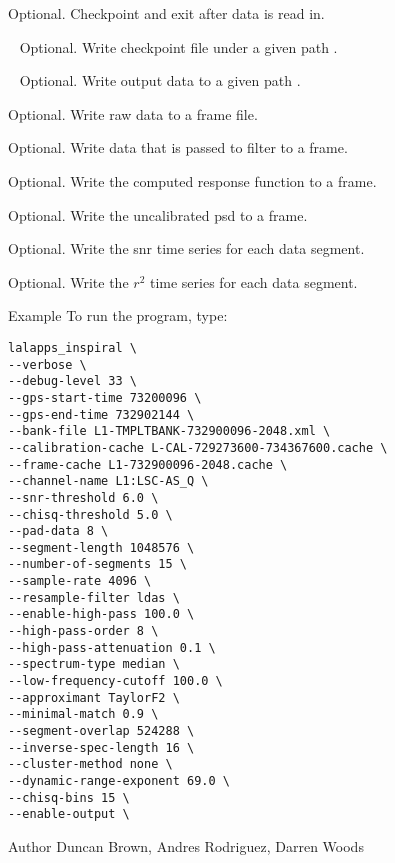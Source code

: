 \begin{entry}
\begin{entry}
\item[\option{--data-checkpoint}] Optional. Checkpoint and exit after data 
is read in.

\item[\option{--checkpoint-path}~\parm{PATH}] Optional. Write checkpoint 
file under a given path .

\item[\option{--output-path}~\parm{PATH}] Optional. Write output data to 
a given path .

\item[\option{--write-raw-data}] Optional. Write raw data to a frame file.

\item[\option{--write-filter-data}] Optional. Write data that is passed to 
filter to a frame.

\item[\option{--write-response}] Optional. Write the computed response 
function to a frame.

\item[\option{--write-spectrum}] Optional. Write the uncalibrated psd to a 
frame.

\item[\option{--write-snrsq}] Optional. Write the snr time series for each 
data segment.

\item[\option{--write-chisq}] Optional. Write the $r^2$ time series for each 
data segment.


\end{entry}

\item[Example]
To run the program, type:
\begin{verbatim}
lalapps_inspiral \
--verbose \
--debug-level 33 \ 
--gps-start-time 73200096 \
--gps-end-time 732902144 \
--bank-file L1-TMPLTBANK-732900096-2048.xml \
--calibration-cache L-CAL-729273600-734367600.cache \ 
--frame-cache L1-732900096-2048.cache \
--channel-name L1:LSC-AS_Q \
--snr-threshold 6.0 \
--chisq-threshold 5.0 \
--pad-data 8 \
--segment-length 1048576 \
--number-of-segments 15 \
--sample-rate 4096 \
--resample-filter ldas \
--enable-high-pass 100.0 \ 
--high-pass-order 8 \
--high-pass-attenuation 0.1 \ 
--spectrum-type median \
--low-frequency-cutoff 100.0 \ 
--approximant TaylorF2 \
--minimal-match 0.9 \
--segment-overlap 524288 \
--inverse-spec-length 16 \
--cluster-method none \
--dynamic-range-exponent 69.0 \ 
--chisq-bins 15 \
--enable-output \
\end{verbatim} 





\item[Author] Duncan Brown, Andres Rodriguez, Darren Woods 
\end{entry}
